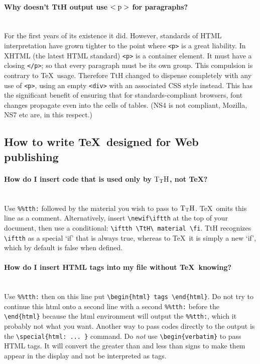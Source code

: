 \documentclass[12pt]{article}
\newif\iftth
\def\TtH{$\rm{}T_TH$}
\begin{document}
\paragraph{Why doesn't TtH output use $\rm <p>$ for paragraphs?}\leavevmode\\
 For the first years of its existence it
did. However, standards of HTML interpretation have grown tighter to
the point where \verb!<p>! is a great liability. In XHTML (the latest
HTML standard) \verb!<p>! is a container element. It must have a
closing \verb!</p>!; so that every paragraph must be its own
group. This compulsion is contrary to \TeX\ usage. Therefore TtH
changed to dispense completely with any use of \verb!<p>!, using an
empty \verb!<div>! with an associated CSS style instead. This has the
significant benefit of ensuring that for standards-compliant browsers,
font changes propagate even into the cells of tables. (NS4 is not
compliant, Mozilla, NS7 etc are, in this respect.)

\subsection{How to write \TeX\ designed for Web publishing}

\index{Tth@\TtH-only code}
\paragraph{How do I insert code that is used only by \TtH, not \TeX?}\leavevmode\\
Use \verb+%%tth:+ followed by the material you wish to pass to \TtH.
\TeX\ omits this line as a comment. Alternatively, insert \verb|\newif\iftth|
at the top of your document, then use a conditional:
\verb|\iftth \TtH\ material \fi|. TtH recognizes \verb|\iftth| as a
special `if' that is always true, whereas to \TeX\ it is simply a
new `if', which by default is false when defined.

\paragraph{How do I insert HTML tags into my file without \TeX\ knowing?}\leavevmode\\
Use \verb+%%tth:+ then on this line put 
\verb+\begin{html} tags \end{html}+. Do not try to continue this
html onto a second line with a second \verb+%%tth:+ before the
\verb+\end{html}+ because the html environment will output the
\verb+%%tth:+, which it probably not what you want. Another way to
pass codes directly to the output is the \verb+\special{html: ... }+
command. Do
\emph{not} use \verb+\begin{verbatim}+ to pass HTML tags. It will
convert the greater than and less than signs to make them appear in
the display and not be interpreted as tags.
\end{document}
